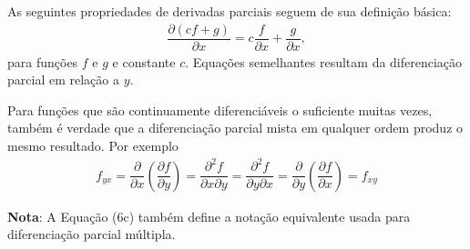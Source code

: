 As seguintes propriedades de derivadas parciais seguem de sua definição básica:
\begin{eqnarray}\label{eq:09.06ab}
\dfrac{\partial (cf+g)}{\partial x} = c\dfrac{f}{\partial x} + \dfrac{g}{\partial x},
\end{eqnarray}
para funções $f$ e $g$ e constante $c$. Equações semelhantes resultam da diferenciação parcial em relação a $y$.

Para funções que são continuamente diferenciáveis o suficiente muitas vezes, também é verdade que a diferenciação parcial mista em qualquer ordem produz o mesmo resultado. Por exemplo
\begin{eqnarray}\label{eq:09.06c}
f_{yx}
= \dfrac{\partial}{\partial x} \left(\dfrac{\partial f}{\partial y}\right)
= \dfrac{\partial^2 f}{\partial x \partial y} 
= \dfrac{\partial^2 f}{\partial y \partial x}
= \dfrac{\partial}{\partial y} \left(\dfrac{\partial f}{\partial x}\right)
= f_{xy}
\end{eqnarray}

\textbf{Nota}: A Equação (6c) também define a notação equivalente usada para diferenciação parcial múltipla.


